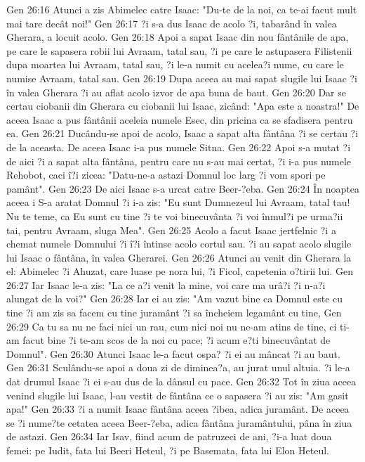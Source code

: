 Gen 26:16  Atunci a zis Abimelec catre Isaac: "Du-te de la noi, ca te-ai facut mult mai tare decât noi!"
Gen 26:17  ?i s-a dus Isaac de acolo ?i, tabarând în valea Gherara, a locuit acolo.
Gen 26:18  Apoi a sapat Isaac din nou fântânile de apa, pe care le sapasera robii lui Avraam, tatal sau, ?i pe care le astupasera Filistenii dupa moartea lui Avraam, tatal sau, ?i le-a numit cu acelea?i nume, cu care le numise Avraam, tatal sau.
Gen 26:19  Dupa aceea au mai sapat slugile lui Isaac ?i în valea Gherara ?i au aflat acolo izvor de apa buna de baut.
Gen 26:20  Dar se certau ciobanii din Gherara cu ciobanii lui Isaac, zicând: "Apa este a noastra!" De aceea Isaac a pus fântânii aceleia numele Esec, din pricina ca se sfadisera pentru ea.
Gen 26:21  Ducându-se apoi de acolo, Isaac a sapat alta fântâna ?i se certau ?i de la aceasta. De aceea Isaac i-a pus numele Sitna.
Gen 26:22  Apoi s-a mutat ?i de aici ?i a sapat alta fântâna, pentru care nu s-au mai certat, ?i i-a pus numele Rehobot, caci î?i zicea: "Datu-ne-a astazi Domnul loc larg ?i vom spori pe pamânt".
Gen 26:23  De aici Isaac s-a urcat catre Beer-?eba.
Gen 26:24  În noaptea aceea i S-a aratat Domnul ?i i-a zis: "Eu sunt Dumnezeul lui Avraam, tatal tau! Nu te teme, ca Eu sunt cu tine ?i te voi binecuvânta ?i voi înmul?i pe urma?ii tai, pentru Avraam, sluga Mea".
Gen 26:25  Acolo a facut Isaac jertfelnic ?i a chemat numele Domnului ?i î?i întinse acolo cortul sau. ?i au sapat acolo slugile lui Isaac o fântâna, în valea Gherarei.
Gen 26:26  Atunci au venit din Gherara la el: Abimelec ?i Ahuzat, care luase pe nora lui, ?i Ficol, capetenia o?tirii lui.
Gen 26:27  Iar Isaac le-a zis: "La ce a?i venit la mine, voi care ma urâ?i ?i n-a?i alungat de la voi?"
Gen 26:28  Iar ei au zis: "Am vazut bine ca Domnul este cu tine ?i am zis sa facem cu tine juramânt ?i sa încheiem legamânt cu tine,
Gen 26:29  Ca tu sa nu ne faci nici un rau, cum nici noi nu ne-am atins de tine, ci ti-am facut bine ?i te-am scos de la noi cu pace; ?i acum e?ti binecuvântat de Domnul".
Gen 26:30  Atunci Isaac le-a facut ospa? ?i ei au mâncat ?i au baut.
Gen 26:31  Sculându-se apoi a doua zi de diminea?a, au jurat unul altuia. ?i le-a dat drumul Isaac ?i ei s-au dus de la dânsul cu pace.
Gen 26:32  Tot în ziua aceea venind slugile lui Isaac, l-au vestit de fântâna ce o sapasera ?i au zis: "Am gasit apa!"
Gen 26:33  ?i a numit Isaac fântâna aceea ?ibea, adica juramânt. De aceea se ?i nume?te cetatea aceea Beer-?eba, adica fântâna juramântului, pâna în ziua de astazi.
Gen 26:34  Iar Isav, fiind acum de patruzeci de ani, ?i-a luat doua femei: pe Iudit, fata lui Beeri Heteul, ?i pe Basemata, fata lui Elon Heteul.
